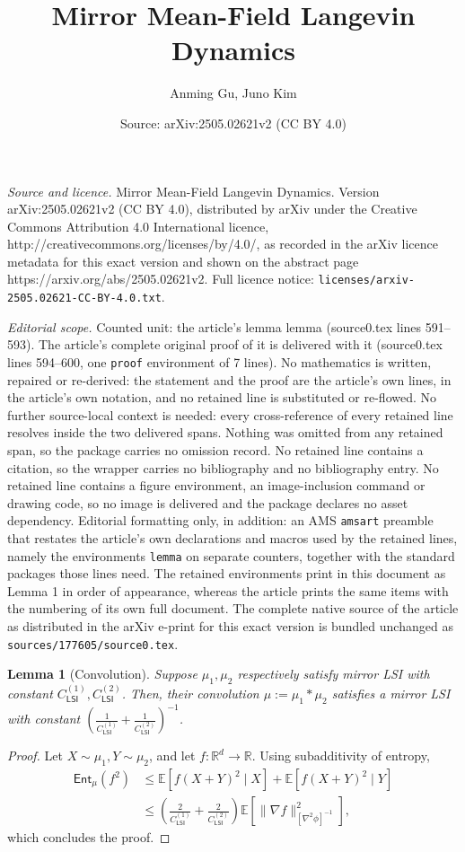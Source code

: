 \documentclass[10pt,a4paper]{amsart}
\title{Mirror Mean-Field Langevin Dynamics}
\author{Anming Gu, Juno Kim}
\date{Source: arXiv:2505.02621v2 (CC BY 4.0)}
\newtheorem{lemma}{Lemma}
\newcommand{\CLSI}[0]{C_{\mathsf{LSI}}}
\newcommand{\E}[0]{\mathbb{E}}
\newcommand{\Ent}[0]{\mathsf{Ent}}
\newcommand{\R}[0]{\mathbb{R}}
\begin{document}
\maketitle

\noindent\emph{Source and licence.} Mirror Mean-Field Langevin Dynamics. Version arXiv:2505.02621v2 (CC BY 4.0), distributed by arXiv under the Creative Commons Attribution 4.0 International licence, http://creativecommons.org/licenses/by/4.0/, as recorded in the arXiv licence metadata for this exact version and shown on the abstract page https://arxiv.org/abs/2505.02621v2. Full licence notice: \texttt{licenses/arxiv-2505.02621-CC-BY-4.0.txt}.\par\smallskip

\noindent\textit{Editorial scope.} Counted unit: the article's lemma lemma (source0.tex lines 591--593). The article's complete original proof of it is delivered with it (source0.tex lines 594--600, one \texttt{proof} environment of 7 lines). No mathematics is written, repaired or re-derived: the statement and the proof are the article's own lines, in the article's own notation, and no retained line is substituted or re-flowed.  No further source-local context is needed: every cross-reference of every retained line resolves inside the two delivered spans.  Nothing was omitted from any retained span, so the package carries no omission record.  No retained line contains a citation, so the wrapper carries no bibliography and no bibliography entry.  No retained line contains a figure environment, an image-inclusion command or drawing code, so no image is delivered and the package declares no asset dependency.  Editorial formatting only, in addition: an AMS \texttt{amsart} preamble that restates the article's own declarations and macros used by the retained lines, namely the environments \texttt{lemma} on separate counters, together with the standard packages those lines need.  The retained environments print in this document as Lemma 1 in order of appearance, whereas the article prints the same items with the numbering of its own full document.  The complete native source of the article as distributed in the arXiv e-print for this exact version is bundled unchanged as \texttt{sources/177605/source0.tex}.
\begin{lemma}[Convolution]
    Suppose $\mu_1, \mu_2$ respectively satisfy mirror LSI with constant $\CLSI^{(1)}, \CLSI^{(2)}$. Then, their convolution $\mu := \mu_1 * \mu_2$ satisfies a mirror LSI with constant $\left(\frac1{\CLSI^{(1)}}+\frac1{\CLSI^{(2)}}\right)^{-1}$.
\end{lemma}

\begin{proof}
    Let $X\sim \mu_1, Y\sim \mu_2$, and let $f:\R^d\to\R$. Using subadditivity of entropy, \begin{align*}
        \Ent_\mu(f^2)&\le \E[f(X+Y)^2\mid X] + \E[f(X+Y)^2\mid Y]\\
        &\le \left(\frac{2}{\CLSI^{(1)}}+\frac{2}{\CLSI^{(2)}}\right)\E[\|\nabla f\|_{[\nabla^2\phi]^{-1}}^2],
    \end{align*}
which concludes the proof.
\end{proof}
\end{document}
